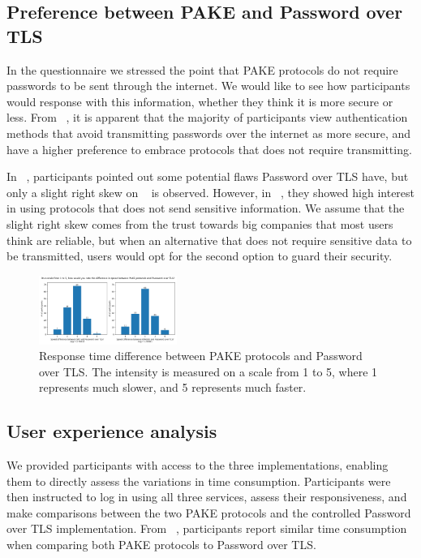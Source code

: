 \subsection{Preference between PAKE and Password over TLS}
\label{sec:preference}

In the questionnaire we stressed the point that PAKE protocols do not require passwords to be sent through the internet.
We would like to see how participants would response with this information, whether they think it is more secure or less.
From ~, it is apparent that the majority of participants view authentication methods that avoid transmitting passwords over the internet as more secure, and have a higher preference to embrace protocols that does not require transmitting.

In ~, participants pointed out some potential flaws Password over TLS have, but only a slight right skew on ~ is observed.
However, in ~, they showed high interest in using protocols that does not send sensitive information. 
We assume that the slight right skew comes from the trust towards big companies that most users think are reliable, but when an alternative that does not require sensitive data to be transmitted, users would opt for the second option to guard their security.

\begin{figure}[ht]
  \centering
  \includegraphics[width=0.4\textwidth]{./images/ux_compare.png}
  \caption{Response time difference between PAKE protocols and Password over TLS.
  The intensity is measured on a scale from 1 to 5, where 1 represents much slower, and 5 represents much faster.}
  \label{fig:compare}
\end{figure}

\subsection{User experience analysis}
We provided participants with access to the three implementations, enabling them to directly assess the variations in time consumption. 
Participants were then instructed to log in using all three services, assess their responsiveness, and make comparisons between the two PAKE protocols and the controlled Password over TLS implementation.
From ~, participants report similar time consumption when comparing both PAKE protocols to Password over TLS.

